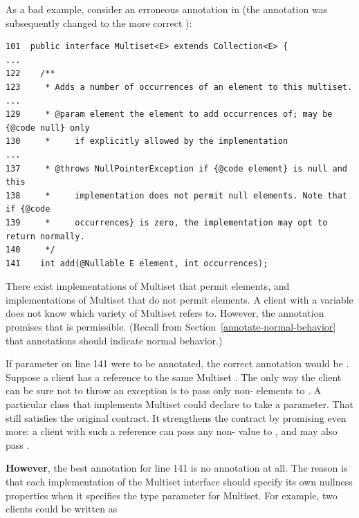 \begin{sloppypar}
As a bad example, consider an erroneous  annotation in
 (the annotation was
subsequently changed to the more correct ):
\end{sloppypar}

\begin{Verbatim}
101  public interface Multiset<E> extends Collection<E> {
...
122    /**
123     * Adds a number of occurrences of an element to this multiset.
...
129     * @param element the element to add occurrences of; may be {@code null} only
130     *     if explicitly allowed by the implementation
...
137     * @throws NullPointerException if {@code element} is null and this
138     *     implementation does not permit null elements. Note that if {@code
139     *     occurrences} is zero, the implementation may opt to return normally.
140     */
141    int add(@Nullable E element, int occurrences);
\end{Verbatim}

There exist implementations of Multiset that permit  elements,
and implementations of Multiset that do not permit  elements.  A
client with a variable  does not know which variety of
Multiset  refers to.  However, the  annotation
promises that  is permissible.  (Recall from
Section~\ref{annotate-normal-behavior} that annotations should indicate
normal behavior.)

If parameter  on line 141 were to be annotated, the correct
annotation would be .  Suppose a client has a reference to
the same Multiset .  The only way the client can be sure not to throw an exception is to pass
only non- elements to .  A particular class
that implements Multiset could declare  to take a
 parameter.  That still satisfies the original contract.
It strengthens the contract by promising even more:  a client with such a
reference can pass any non- value to , and may also
pass .

\textbf{However}, the best annotation for line 141 is no annotation at all.
The reason is that each implementation of the Multiset interface should
specify its own nullness properties when it specifies the type parameter
for Multiset.  For example, two clients could be written as

